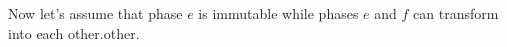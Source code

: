 Now let's assume that phase \(e\) is immutable while phases \(e\) and \(f\) can transform into each other.other.